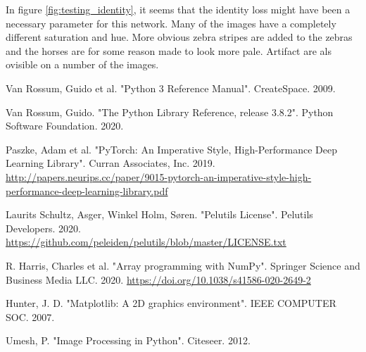 \documentclass[11pt, fleqn, titlepage]{article}
\newcommand{\1}[1]{\mathds{1}\left[#1\right]}
\begin{document}
In figure \ref{fig:testing_identity}, it seems that the identity loss might have been a necessary parameter for this network. Many of the images have a completely different saturation and hue. More obvious zebra stripes are added to the zebras and the horses are for some reason made to look more pale. Artifact are als ovisible on a number of the images.


\newpage
\begin{thebibliography}{9} 
	
	
	
		
		 Van Rossum, Guido et al. "Python 3 Reference Manual". CreateSpace. 2009.
		
		 Van Rossum, Guido. "The Python Library Reference, release 3.8.2". Python Software Foundation. 2020.
		
		 Paszke, Adam et al. "PyTorch: An Imperative Style, High-Performance Deep Learning Library". Curran Associates, Inc. 2019. \url{http://papers.neurips.cc/paper/9015-pytorch-an-imperative-style-high-performance-deep-learning-library.pdf}
		
		 Laurits Schultz, Asger, Winkel Holm, Søren. "Pelutils License". Pelutils Developers. 2020. \url{https://github.com/peleiden/pelutils/blob/master/LICENSE.txt}
		
		 R. Harris, Charles et al. "Array programming with NumPy". Springer Science and Business Media LLC. 2020. \url{https://doi.org/10.1038/s41586-020-2649-2}
		
		 Hunter, J. D. "Matplotlib: A 2D graphics environment". IEEE COMPUTER SOC. 2007.
		
		 Umesh, P. "Image Processing in Python". Citeseer. 2012.
		

\end{thebibliography}
\end{document}
